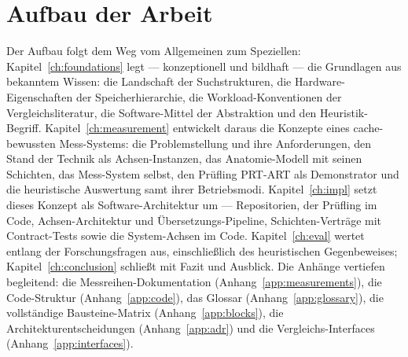 \section{Aufbau der Arbeit}\label{sec:structure}
Der Aufbau folgt dem Weg vom Allgemeinen zum Speziellen: Kapitel~\ref{ch:foundations} legt --- konzeptionell und
bildhaft --- die Grundlagen aus bekanntem Wissen: die Landschaft der Suchstrukturen, die
Hardware-Eigenschaften der Speicherhierarchie, die Workload-Konventionen der Vergleichsliteratur, die
Software-Mittel der Abstraktion und den Heuristik-Begriff. Kapitel~\ref{ch:measurement} entwickelt
daraus die Konzepte eines cache-bewussten Mess-Systems: die Problemstellung und ihre Anforderungen, den
Stand der Technik als Achsen-Instanzen, das Anatomie-Modell mit seinen Schichten, das Mess-System
selbst, den Prüfling PRT-ART als Demonstrator und die heuristische Auswertung samt ihrer
Betriebsmodi. Kapitel~\ref{ch:impl} setzt dieses Konzept als Software-Architektur um --- Repositorien,
der Prüfling im Code, Achsen-Architektur und Übersetzungs-Pipeline, Schichten-Verträge mit
Contract-Tests sowie die System-Achsen im Code. Kapitel~\ref{ch:eval} wertet entlang der
Forschungsfragen aus, einschließlich des heuristischen Gegenbeweises; Kapitel~\ref{ch:conclusion}
schließt mit Fazit und Ausblick. Die Anhänge vertiefen begleitend: die Messreihen-Dokumentation (Anhang~\ref{app:measurements}),
die Code-Struktur (Anhang~\ref{app:code}), das Glossar (Anhang~\ref{app:glossary}), die vollständige
Bausteine-Matrix (Anhang~\ref{app:blocks}), die Architekturentscheidungen (Anhang~\ref{app:adr}) und die
Vergleichs-Interfaces (Anhang~\ref{app:interfaces}).
